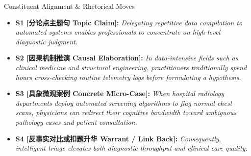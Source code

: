 \begin{TipBox}{Constituent Alignment \& Rhetorical Moves}
\begin{itemize}[leftmargin=1.5em]
  \item \textbf{S1 [分论点主题句 Topic Claim]:} \textit{Delegating repetitive data compilation to automated systems enables professionals to concentrate on high-level diagnostic judgment.}\par{}
  \item \textbf{S2 [因果机制推演 Causal Elaboration]:} \textit{In data-intensive fields such as clinical medicine and structural engineering, practitioners traditionally spend hours cross-checking routine telemetry logs before formulating a hypothesis.}\par{}
  \item \textbf{S3 [具象微观案例 Concrete Micro-Case]:} \textit{When hospital radiology departments deploy automated screening algorithms to flag normal chest scans, physicians can redirect their cognitive bandwidth toward ambiguous pathology cases and patient consultation.}\par{}
  \item \textbf{S4 [反事实对比或扣题升华 Warrant / Link Back]:} \textit{Consequently, intelligent triage elevates both diagnostic throughput and clinical care quality.}\par{}
\end{itemize}
\end{TipBox}
\bigskip
